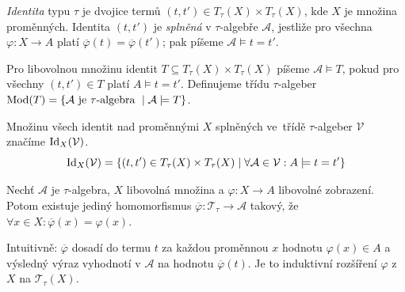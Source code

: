 \begin{definition}
    {\em Identita} typu $\tau$ je dvojice termů
    $(t, t') \in T_\tau(X) \times T_\tau(X)$,
    kde $X$ je množina proměnných.
    Identita $(t, t')$ je {\em splněná} v $\tau$-algebře $\mathcal{A}$,
    jestliže pro všechna $\varphi : X \to A$
    platí $\overline{\varphi}(t) = \overline{\varphi}(t')$; pak píšeme
    $\mathcal{A} \models t = t'$.
\end{definition}

\begin{definition}
    Pro libovolnou množinu identit
    $T \subseteq T_\tau(X) \times T_\tau(X)$
    píšeme $\mathcal{A} \models T$, pokud
    pro všechny $(t, t') \in T$ platí $A \models t = t'$.
    Definujeme třídu $\tau$-algeber
    $\operatorname{Mod}(T) = \{\mathcal{A} \text{ je $ \tau$-algebra } \mid
    \mathcal{A} \models T \}$.
\end{definition}

\begin{definition}[$\Id$]
    Množinu všech identit nad proměnnými $X$ splněných \linebreak ve~třídě
    $\tau$-algeber $\mathcal{V}$ značíme $\operatorname{Id}_X(\mathcal{V})$.
    \[
        \operatorname{Id}_X(\mathcal{V})
        = \{ (t, t') \in T_\tau(X) \times T_\tau(X)
            \mid \forall \mathcal{A} \in \mathcal{V}
            : A \models t = t' \}
    \]
\end{definition}


\begin{theorem}
Nechť $\mathcal{A}$ je $\tau$-algebra,
$X$ libovolná množina a $\varphi : X \to A$ libovolné zobrazení.
Potom existuje jediný homomorfismus
$\overline{\varphi} : \mathcal{T}_\tau \to \mathcal{A}$ takový,
že \linebreak $\forall x \in X : \overline{\varphi}(x) = \varphi(x)$.

\center
{}

\end{theorem}

\noindent
Intuitivně: $\overline{\varphi}$ dosadí do termu $t$ za každou proměnnou
$x$ hodnotu $\varphi(x) \in A$ a výsledný výraz vyhodnotí v
$\mathcal{A}$ na hodnotu $\overline{\varphi}(t)$.
Je to induktivní rozšíření $\varphi$ z~$X$ na $\mathcal{T}_\tau(X)$.

